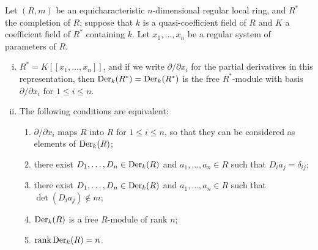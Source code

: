 \begin{theorem}\label{thm:30.6}
Let $(R, m)$ be an equicharacteristic $n$-dimensional regular local ring, and $R^*$
the completion of $R$; suppose that $k$ is a quasi-coefficient field of $R$ and $K$ a
coefficient field of $R^*$ containing $k$. Let $x_1, \ldots, x_n$ be a regular system of
parameters of $R$.
\begin{enumerate}[(i)]
  \item $R^* = K[[x_1, \ldots, x_n]]$, and if we write $\partial/\partial x_i$ for the partial
        derivatives in this representation, then $\operatorname{Der}_k(R^*) = \operatorname{Der}_k(R^*)$ is the free
        $R^*$-module with basis $\partial/\partial x_i$ for $1 \le i \le n$.
  \item The following conditions are equivalent:
        \begin{enumerate}[(1)]
          \item $\partial/\partial x_i$ maps $R$ into $R$ for $1 \le i \le n$, so that they can be
                considered as elements of $\operatorname{Der}_k(R)$;
          \item there exist $D_1, \ldots, D_n \in \operatorname{Der}_k(R)$ and $a_1, \ldots, a_n \in R$ such
                that $D_ia_j = \delta_{ij}$;
          \item there exist $D_1, \ldots, D_n \in \operatorname{Der}_k(R)$ and $a_1, \ldots, a_n \in R$ such
                that $\det(D_ia_j) \notin m$;
          \item $\operatorname{Der}_k(R)$ is a free $R$-module of rank $n$;
          \item $\operatorname{rank} \operatorname{Der}_k(R) = n$.
        \end{enumerate}
\end{enumerate}
\end{theorem}

